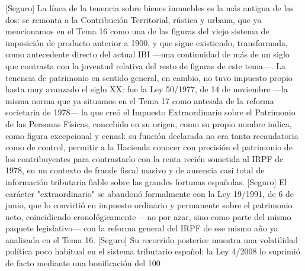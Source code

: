 \documentclass[10pt,a4paper]{article}
\begin{document}
[Seguro] La línea de la tenencia sobre bienes inmuebles es la más antigua de las dos: se remonta a la Contribución Territorial, rústica y urbana, que ya mencionamos en el Tema 16 como una de las figuras del viejo sistema de imposición de producto anterior a 1900, y que sigue existiendo, transformada, como antecedente directo del actual IBI —una continuidad de más de un siglo que contrasta con la juventud relativa del resto de figuras de este tema—. La tenencia de patrimonio en sentido general, en cambio, no tuvo impuesto propio hasta muy avanzado el siglo XX: fue la Ley 50/1977, de 14 de noviembre —la misma norma que ya situamos en el Tema 17 como antesala de la reforma societaria de 1978— la que creó el Impuesto Extraordinario sobre el Patrimonio de las Personas Físicas, concebido en su origen, como su propio nombre indica, como figura excepcional y censal: su función declarada no era tanto recaudatoria como de control, permitir a la Hacienda conocer con precisión el patrimonio de los contribuyentes para contrastarlo con la renta recién sometida al IRPF de 1978, en un contexto de fraude fiscal masivo y de ausencia casi total de información tributaria fiable sobre las grandes fortunas españolas. [Seguro] El carácter "extraordinario" se abandonó formalmente con la Ley 19/1991, de 6 de junio, que lo convirtió en impuesto ordinario y permanente sobre el patrimonio neto, coincidiendo cronológicamente —no por azar, sino como parte del mismo paquete legislativo— con la reforma general del IRPF de ese mismo año ya analizada en el Tema 16. [Seguro] Su recorrido posterior muestra una volatilidad política poco habitual en el sistema tributario español: la Ley 4/2008 lo suprimió de facto mediante una bonificación del 100%
\end{document}
